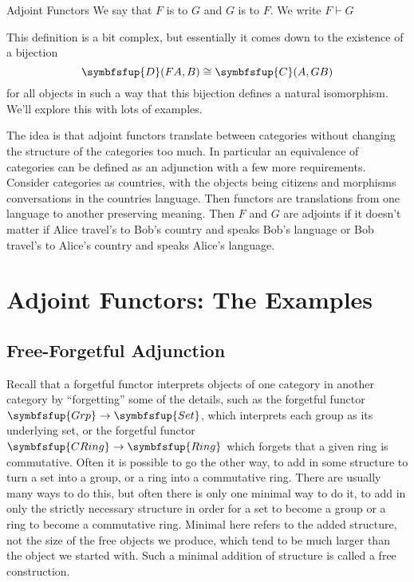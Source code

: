 \documentclass[fleqn]{NotesClass}
\makeatletter
\newcommand{\cat}[1]{\symbfsfup{#1}}
\newcommand{\c@egory}[1]{\symbfsfup{#1}}
\newcommand{\Set}{\c@egory{Set}}
\newcommand{\Grp}{\c@egory{Grp}}
\newcommand{\Ring}{\c@egory{Ring}}
\newcommand{\CRing}{\c@egory{CRing}}
\newcommand{\isomorphic}{\cong}
\newcommand{\leftadjoint}{\vdash}
\makeatother
\begin{document}
\begin{appendices}
\begin{dfn}{Adjoint Functors}{}
            We say that \(F\) is  to \(G\) and \(G\) is  to \(F\).
            We write \(F \leftadjoint G\)
        \end{dfn}
    
        This definition is a bit complex, but essentially it comes down to the existence of a bijection
        \begin{equation}
            \cat{D}(FA, B) \isomorphic \cat{C}(A, GB)
        \end{equation}
        for all objects in such a way that this bijection defines a natural isomorphism.
        We'll explore this with lots of examples.
        
        The idea is that adjoint functors translate between categories without changing the structure of the categories too much.
        In particular an equivalence of categories can be defined as an adjunction with a few more requirements.
        Consider categories as countries, with the objects being citizens and morphisms conversations in the countries language.
        Then functors are translations from one language to another preserving meaning.
        Then \(F\) and \(G\) are adjoints if it doesn't matter if Alice travel's to Bob's country and speaks Bob's language or Bob travel's to Alice's country and speaks Alice's language.
        
        \section{Adjoint Functors: The Examples}
        \subsection{Free-Forgetful Adjunction}
        Recall that a forgetful functor interprets objects of one category in another category by \enquote{forgetting} some of the details, such as the forgetful functor \(\Grp \to \Set\), which interprets each group as its underlying set, or the forgetful functor \(\CRing \to \Ring\) which forgets that a given ring is commutative.
        Often it is possible to go the other way, to add in some structure to turn a set into a group, or a ring into a commutative ring.
        There are usually many ways to do this, but often there is only one minimal way to do it, to add in only the strictly necessary structure in order for a set to become a group or a ring to become a commutative ring.
        Minimal here refers to the added structure, not the size of the free objects we produce, which tend to be much larger than the object we started with.
        Such a minimal addition of structure is called a free construction.
        

\end{appendices}
\end{document}
